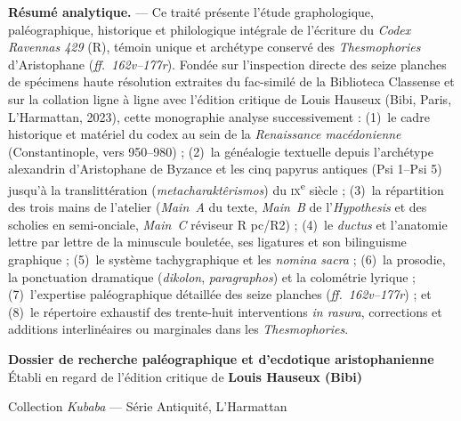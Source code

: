 \documentclass[11pt, a4paper, twoside]{article}
\renewcommand{\_}{\origunderscore\penalty0\relax}
\newcommand{\R}{\textbf{R}}
\newcommand{\Rpc}{\textbf{R}\textsuperscript{pc}}
\newcommand{\Rdeux}{\textbf{R}\textsuperscript{2}}
\newcommand{\Bibi}{\textit{Bibi}}
\newcommand{\PsiUn}{\textgreek{Ψ}\textsuperscript{1}}
\newcommand{\PsiCinq}{\textgreek{Ψ}\textsuperscript{5}}
\def\R{R}%
\def\Rpc{R pc}%
\def\Rdeux{R2}%
\def\Bibi{Bibi}%
\def\PsiUn{Psi 1}%
\def\PsiCinq{Psi 5}%
\begin{document}
\begin{titlepage}
\vspace{1.2cm}
\begin{minipage}{0.88\textwidth}
\small
\textbf{Résumé analytique.} --- Ce traité présente l'étude graphologique, paléographique, historique et philologique intégrale de l'écriture du \textit{Codex Ravennas 429} (\R{}), témoin unique et archétype conservé des \textit{Thesmophories} d'Aristophane (\textit{ff.\ 162v--177r}). Fondée sur l'inspection directe des seize planches de spécimens haute résolution extraites du fac-similé de la Biblioteca Classense et sur la collation ligne à ligne avec l'édition critique de Louis Hauseux (\Bibi{}, Paris, L'Harmattan, 2023), cette monographie analyse successivement : (1)~le cadre historique et matériel du codex au sein de la \textit{Renaissance macédonienne} (Constantinople, vers 950--980) ; (2)~la généalogie textuelle depuis l'archétype alexandrin d'Aristophane de Byzance et les cinq papyrus antiques (\PsiUn{}--\PsiCinq{}) jusqu'à la translittération (\textit{metacharaktêrismos}) du \textsc{ix}\textsuperscript{e} siècle ; (3)~la répartition des trois mains de l'atelier (\textit{Main~A} du texte, \textit{Main~B} de l'\textit{Hypothesis} et des scholies en semi-onciale, \textit{Main~C} réviseur \Rpc{}/\Rdeux{}) ; (4)~le \textit{ductus} et l'anatomie lettre par lettre de la minuscule bouletée, ses ligatures et son bilinguisme graphique ; (5)~le système tachygraphique et les \textit{nomina sacra} ; (6)~la prosodie, la ponctuation dramatique (\textit{dikolon}, \textit{paragraphos}) et la colométrie lyrique ; (7)~l'expertise paléographique détaillée des seize planches (\textit{ff.\ 162v--177r}) ; et (8)~le répertoire exhaustif des trente-huit interventions \textit{in rasura}, corrections et additions interlinéaires ou marginales dans les \textit{Thesmophories}.
\end{minipage}

\vfill
{\large\textbf{Dossier de recherche paléographique et d'ecdotique aristophanienne}\\
Établi en regard de l'édition critique de \textbf{Louis Hauseux (\Bibi{})}\par}
\vspace{0.3cm}
{\normalsize Collection \textit{Kubaba} --- Série Antiquité, L'Harmattan\par}
\end{titlepage}

{\small{}\renewcommand{\numberline}[1]{}\tableofcontents}
\newpage
\end{document}

